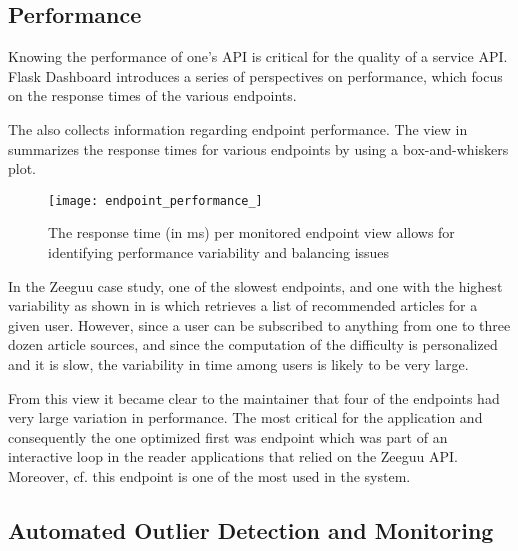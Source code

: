 
\newpage
\subsection{Performance}
\label{sec:perf}

Knowing the performance of one’s API is critical for the quality of a service API. Flask Dashboard introduces a series of perspectives on performance, which focus on the response times of the various endpoints.





The \tool also collects information regarding endpoint performance. The view in  summarizes the response times for various endpoints by using a box-and-whiskers plot. 


 \begin{figure}[!ht]
   \centering
   \texttt{[image: endpoint\_performance\_]}
   \caption{The response time (in ms) per monitored endpoint view allows for identifying performance variability and balancing issues}
   \label{fig:ep}
 \end{figure}



In the Zeeguu case study, one of the slowest endpoints, and one with the highest variability as shown in  is \epFeedItemsColor which retrieves a list of recommended articles for a given user. However, since a user can be subscribed to anything from one to three dozen article sources, and since the computation of the difficulty is personalized and it is slow, the variability in time among users is likely to be very large. 

From this view it became clear to the maintainer that four of the endpoints had very large variation in performance.   The most critical for the application and consequently the one optimized first was \epTranslationsColor endpoint which was part of an interactive loop in the reader applications that relied on the Zeeguu API. Moreover, cf.  this endpoint is one of the most used in the system.



  \subsection{Automated Outlier Detection and Monitoring}
  
